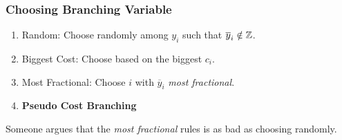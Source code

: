 \subsubsection{Choosing Branching Variable}
\begin{enumerate}
	\item Random: Choose randomly among \(y_{i}\) such that \(\overline{y}_{i}\notin\mathbb{\MakeUppercase{Z}}\).
	\item Biggest Cost: Choose based on the biggest \(c_{i}\).
	\item Most Fractional: Choose \(i\) with \(\overline{y}_{i}\) \emph{most fractional}.
	\item \textbf{Pseudo Cost Branching}
\end{enumerate}

\begin{note}
	Someone argues that the \emph{most fractional} rules is as bad as choosing randomly.
\end{note}
